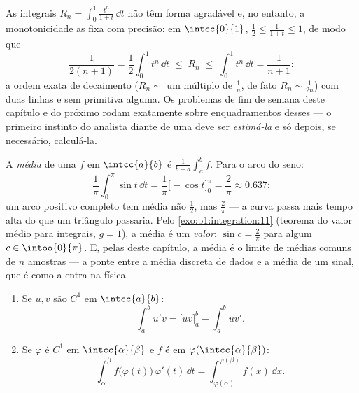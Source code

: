 \begin{example}\label{ex:b1:integration:estimate}
As integrais $R_n = \int_0^1 \frac{t^n}{1 + t}\,\dd t$ não têm
forma  agradável e, no entanto, a monotonicidade as fixa com
precisão: em $\intcc{0}{1}$, $\frac12 \leq \frac{1}{1+t} \leq 1$, de modo que
\[
\frac{1}{2(n+1)} = \frac12\int_0^1 t^n\,\dd t
\;\leq\; R_n \;\leq\; \int_0^1 t^n \,\dd t = \frac{1}{n+1} :
\]
a ordem exata de decaimento ($R_n \sim$ um múltiplo de $\frac1n$,
de fato $R_n \sim \frac{1}{2n}$) com duas linhas e sem
primitiva alguma. Os problemas de fim de semana deste capítulo e do
próximo rodam exatamente sobre enquadramentos desses --- o primeiro
instinto do analista diante de uma  deve ser \emph{estimá-la} e
só depois, se necessário, calculá-la.
\end{example}

\begin{example}\label{ex:b1:integration:average}
A \emph{média} de uma $f$  em $\intcc{a}{b}$ é
$\frac{1}{b-a}\int_a^b f$. Para o arco do seno:
\[
\frac{1}{\pi}\int_0^\pi \sin t\,\dd t
= \frac{1}{\pi}\bigl[-\cos t\bigr]_0^\pi = \frac{2}{\pi}
\approx 0.637 :
\]
um arco positivo completo tem média não $\frac12$, mas
$\frac2\pi$ --- a curva passa mais tempo alta do que um triângulo
passaria. Pelo \cref{exo:b1:integration:11} (teorema do valor médio para
integrais, $g = 1$), a média é um \emph{valor}: $\sin c =
\frac2\pi$ para algum $c \in \intoo{0}{\pi}$. E, pelas  deste capítulo, a média é o limite de médias
comuns de $n$ amostras --- a ponte entre a média discreta de
dados e a média  de um sinal, que é como
a  entra na física.
\end{example}

\begin{theorem}\label{thm:b1:integration:parts}
\begin{enumerate}
  \item Se $u, v$ são $C^1$ em $\intcc{a}{b}$:
        \[
        \int_a^b u'v = \bigl[uv\bigr]_a^b - \int_a^b uv' .
        \]
  \item Se $\varphi$ é $C^1$ em $\intcc{\alpha}{\beta}$ e $f$ é
         em $\varphi(\intcc{\alpha}{\beta})$:
        \[
        \int_{\alpha}^{\beta} f\bigl(\varphi(t)\bigr)\,\varphi'(t)\,
        \dd t = \int_{\varphi(\alpha)}^{\varphi(\beta)} f(x)\, \dd x .
        \]
\end{enumerate}
\end{theorem}


